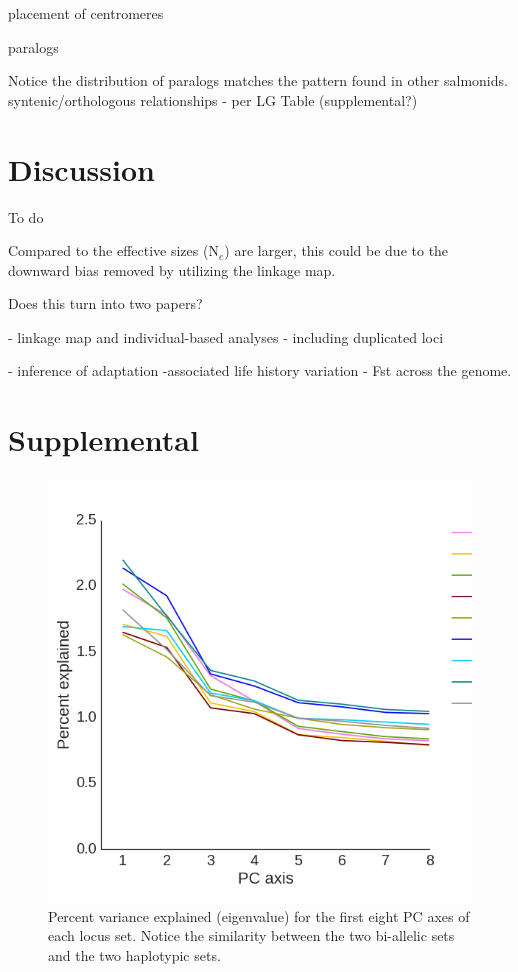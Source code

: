\documentclass[12pt,  one column]{article}
\begin{document}
placement of centromeres

paralogs

Notice the distribution of paralogs matches the  pattern found in other salmonids.
syntenic/orthologous relationships - per LG
Table (supplemental?)

\section*{Discussion}
To do

Compared to \citet{Small2014} the effective sizes (N$_{e}$) are larger, this could be due to the downward bias removed by utilizing the linkage map. 

Does this turn into two papers?

 - linkage map and individual-based analyses - including duplicated loci

 - inference of adaptation -associated  life history variation  - Fst across the genome.

\pagebreak
\section*{Supplemental}



\begin{figure}[H]
\includegraphics[scale=.4]{figures/supplemental/PCA_eigenvalues.png}
\caption{Percent variance explained (eigenvalue) for the first eight PC axes of each locus set.  Notice the similarity between the two bi-allelic sets and the two haplotypic sets.}
\end{figure}
\end{document}

